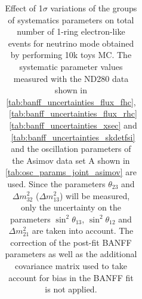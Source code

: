 \begin{table}[htb]
\begin{tabular}{| c | c | c |}
\end{tabular}
\caption{
 Effect of 1$\sigma$ variations of the groups of systematics parameters on total number of
 1-ring electron-like events for neutrino mode obtained by performing 10k toys MC.
The systematic parameter values measured with the ND280 data 
shown in 
\cref{tab:banff_uncertainties_flux_fhc},
~\ref{tab:banff_uncertainties_flux_rhc}
~\ref{tab:banff_uncertainties_xsec}
and
~\ref{tab:banff_uncertainties_skdetfsi}
and the oscillation parameters of the Asimov data set A shown in \cref{tab:osc_params_joint_asimov}
are used.
Since the parameters $\theta_{23}$ and $\Delta m^2_{32}$ ($\Delta m^2_{13}$)
will be measured,
only the uncertainty on the parameters 
$\sin^2 \theta_{13}$,
$\sin^2 \theta_{12}$
and 
$\Delta m^2_{21}$ 
are taken into account.
The correction of the post-fit BANFF parameters as well as the additional covariance matrix 
used to take account for bias in the BANFF fit is not applied.
}                                                                                                                                                                                          
\label{tab:nsk_systematic_table_summary_joint_asimov_A_fhc_elike_NoFluxBias}
\end{table}





